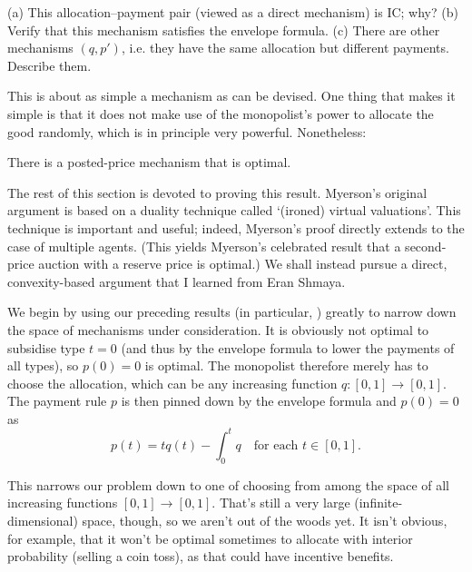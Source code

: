\begin{exercise}
	\label{exercise:posted_price}
	(a) This allocation--payment pair (viewed as a direct mechanism) is IC; why?
	(b) Verify that this mechanism satisfies the envelope formula.
	(c) There are other mechanisms $(q,p')$, i.e. they have the same allocation but different payments. Describe them.
\end{exercise}

This is about as simple a mechanism as can be devised.
One thing that makes it simple is that it does not make use of the monopolist's power to allocate the good randomly, which is in principle very powerful.
Nonetheless:

\begin{theorem}
	\label{theorem:Myerson}
	There is a posted-price mechanism that is optimal.
\end{theorem}

The rest of this section is devoted to proving this result.
Myerson's original argument is based on a duality technique called `(ironed) virtual valuations'. This technique is important and useful; indeed, Myerson's proof directly extends to the case of multiple agents. (This yields Myerson's celebrated result that a second-price auction with a reserve price is optimal.)
We shall instead pursue a direct, convexity-based argument that I learned from Eran Shmaya.

We begin by using our preceding results (in particular, ) greatly to narrow down the space of mechanisms under consideration.
It is obviously not optimal to subsidise type $t=0$ (and thus by the envelope formula to lower the payments of all types), so $p(0)=0$ is optimal.
The monopolist therefore merely has to choose the allocation, which can be any increasing function $q : [0,1] \to [0,1]$.
The payment rule $p$ is then pinned down by the envelope formula and $p(0)=0$ as
%
\begin{equation*}
	p(t)
	= t q(t) - \int_0^t q 
	\quad \text{for each $t \in [0,1]$.}
\end{equation*}

This narrows our problem down to one of choosing from among the space of all increasing functions $[0,1] \to [0,1]$.
That's still a very large (infinite-dimensional) space, though, so we aren't out of the woods yet.
It isn't obvious, for example, that it won't be optimal sometimes to allocate with interior probability (selling a coin toss), as that could have incentive benefits.

